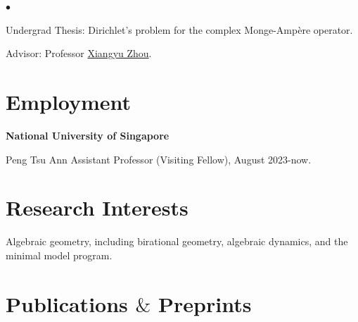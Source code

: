 \documentclass[margin,line,pifont,palatino,courier]{res}
\newenvironment{list1}{
  \begin{list}{\ding{113}}{%
      \setlength{\itemsep}{0in}
      \setlength{\parsep}{0in} \setlength{\parskip}{0in}
      \setlength{\topsep}{0in} \setlength{\partopsep}{0in}
      \setlength{\leftmargin}{0.17in}}}{\end{list}}
\newenvironment{list2}{
  \begin{list}{$\bullet$}{%
      \setlength{\itemsep}{0in}
      \setlength{\parsep}{0in} \setlength{\parskip}{0in}
      \setlength{\topsep}{0in} \setlength{\partopsep}{0in}
      \setlength{\leftmargin}{0.2in}}}{\end{list}}
\begin{document}
\begin{resume}
\begin{list1}
\begin{list2}
\vspace*{.05in}
\item Undergrad Thesis: Dirichlet's problem for the complex Monge-Amp\`ere operator.
\item Advisor: Professor \href{http://www.math.ac.cn/hml/english/Academic2019/201903/t20190312_641152.html}{Xiangyu Zhou}.
\end{list2}

\end{list1}


\section{\sc Employment}

{\bf  National University of Singapore}\\
\vspace*{-.1in}
\begin{list1}
\item[] Peng Tsu Ann Assistant Professor (Visiting Fellow), August 2023-now.
\end{list1}


\section{\sc Research Interests}
Algebraic geometry, including birational geometry, algebraic dynamics, and the minimal model program.

\section{\sc Publications $\&$ Preprints}


\end{resume}
\end{document}
